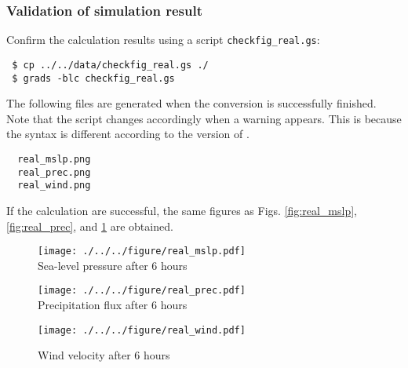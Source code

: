 \subsubsection{Validation of simulation result}
Confirm the calculation results using a \grads script \verb|checkfig_real.gs|: 
\begin{verbatim}
 $ cp ../../data/checkfig_real.gs ./
 $ grads -blc checkfig_real.gs
\end{verbatim}
The following files are generated when the conversion is successfully finished.
Note that the script changes accordingly when a warning appears.
This is because the syntax is different according to the version of \grads.
\begin{verbatim}
  real_mslp.png
  real_prec.png
  real_wind.png
\end{verbatim}
If the calculation are successful,
the same figures as Figs. \ref{fig:real_mslp}, \ref{fig:real_prec}, and \ref{fig:real_wind} are obtained.

\begin{figure}[tbh]
\begin{center}
  \texttt{[image: ./../../figure/real\_mslp.pdf]}\\
  \caption{Sea-level pressure after 6 hours}
  \label{fig:real_mslp}
\end{center}
\begin{center}
  \texttt{[image: ./../../figure/real\_prec.pdf]}\\
  \caption{Precipitation flux after 6 hours}
  \label{fig:real_prec}
\end{center}
\begin{center}
  \texttt{[image: ./../../figure/real\_wind.pdf]}\\
  \caption{Wind velocity after 6 hours}
  \label{fig:real_wind}
\end{center}
\end{figure}

